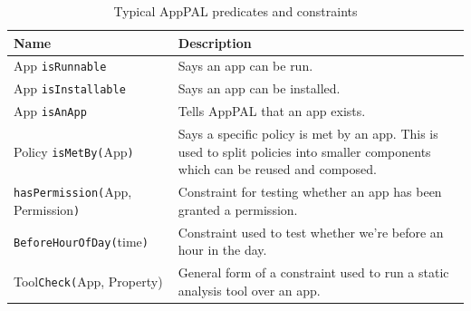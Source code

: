 \documentclass[]{llncs}
\begin{document}
\begin{table}
\begin{tabulary}{\linewidth}{l L}
  \toprule
  Name & Description \\
  \midrule
  App \texttt{isRunnable} & Says an app can be run. \\
  App \texttt{isInstallable} & Says an app can be installed. \\
  App \texttt{isAnApp} & Tells AppPAL that an app exists. \\
  Policy \texttt{isMetBy(}App\texttt{)} & Says a specific policy is met by an app.  This is used to split policies into smaller components which can be reused and composed. \\
  \texttt{hasPermission(}App, Permission\texttt{)} & Constraint for testing whether an app has been granted a permission. \\
  \texttt{BeforeHourOfDay(}time\texttt{)} & Constraint used to test whether we're before an hour in the day. \\
  Tool\texttt{Check(}App, Property) &  General form of a constraint used to run a static analysis tool over an app. \\
  \bottomrule
\end{tabulary}
\caption{Typical AppPAL predicates and constraints}
\label{tab:predicates}
\end{table}



%
%
%
\end{document}

